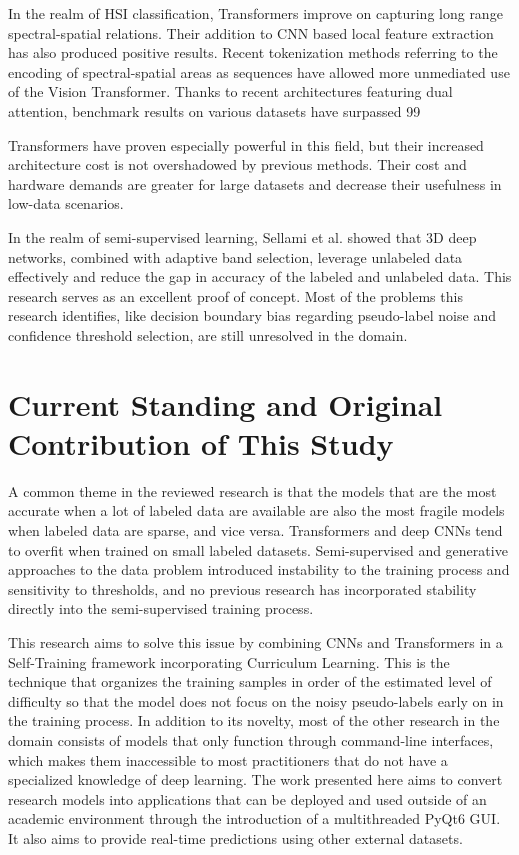 In the realm of HSI classification, Transformers improve on capturing long range spectral-spatial relations. Their addition to CNN based local feature extraction has also produced positive results. Recent tokenization methods referring to the encoding of spectral-spatial areas as sequences have allowed more unmediated use of the Vision Transformer. Thanks to recent architectures featuring dual attention, benchmark results on various datasets have surpassed 99%

Transformers have proven especially powerful in this field, but their increased architecture cost is not overshadowed by previous methods. Their cost and hardware demands are greater for large datasets and decrease their usefulness in low-data scenarios.

In the realm of semi-supervised learning, Sellami et al. showed that 3D deep networks, combined with adaptive band selection, leverage unlabeled data effectively and reduce the gap in accuracy of the labeled and unlabeled data. This research serves as an excellent proof of concept. Most of the problems this research identifies, like decision boundary bias regarding pseudo-label noise and confidence threshold selection, are still unresolved in the domain.

\section{Current Standing and Original Contribution of This Study}

A common theme in the reviewed research is that the models that are the most accurate when a lot of labeled data are available are also the most fragile models when labeled data are sparse, and vice versa. Transformers and deep CNNs tend to overfit when trained on small labeled datasets. Semi-supervised and generative approaches to the data problem introduced instability to the training process and sensitivity to thresholds, and no previous research has incorporated stability directly into the semi-supervised training process.

This research aims to solve this issue by combining CNNs and Transformers in a Self-Training framework incorporating Curriculum Learning. This is the technique that organizes the training samples in order of the estimated level of difficulty so that the model does not focus on the noisy pseudo-labels early on in the training process. In addition to its novelty, most of the other research in the domain consists of models that only function through command-line interfaces, which makes them inaccessible to most practitioners that do not have a specialized knowledge of deep learning. The work presented here aims to convert research models into applications that can be deployed and used outside of an academic environment through the introduction of a multithreaded PyQt6 GUI. It also aims to provide real-time predictions using other external datasets.

